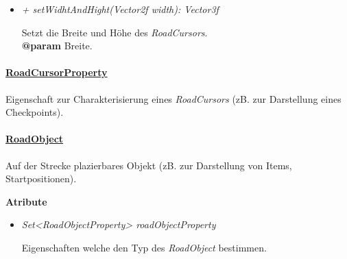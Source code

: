 \begin{itemize}
            \item  \textit{+ setWidhtAndHight(Vector2f width): Vector3f}
                \begin{leftbar}[0.9\linewidth]
                    Setzt die Breite und Höhe des \textit{RoadCursors}.\\
                    \textbf{@param} Breite.
                \end{leftbar}
        \end{itemize}

    \paragraph{\underline{RoadCursorProperty}} \mbox{}\par
    Eigenschaft zur Charakterisierung eines \textit{RoadCursors}
    (zB. zur Darstellung eines Checkpoints).
    \par

    \pagebreak
    \paragraph{\underline{RoadObject}} \mbox{}\par
        Auf der Strecke plazierbares Objekt
        (zB. zur Darstellung von Items, Startpositionen).
        \par

        \textbf{Atribute}
            \begin{itemize}

                \item  \textit{Set<RoadObjectProperty> roadObjectProperty}
                    \begin{leftbar}[0.9\linewidth]
                        Eigenschaften welche den Typ des \textit{RoadObject} bestimmen.\\
                    \end{leftbar}

            \end{itemize}
        
